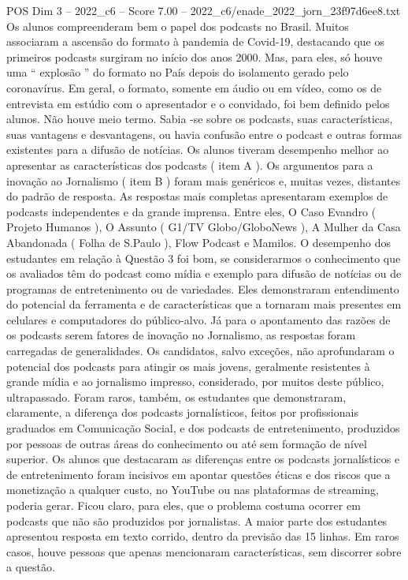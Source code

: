\begin{textsample}{POS Dim 3 – 2022\_c6 – Score 7.00 – 2022\_c6/enade\_2022\_jorn\_23f97d6ee8.txt}
Os alunos compreenderam bem o papel dos podcasts no Brasil.
Muitos associaram a ascensão do formato à pandemia de Covid-19, destacando que os primeiros podcasts surgiram no início dos anos 2000.
Mas, para eles, só houve uma “ explosão ” do formato no País depois do isolamento gerado pelo coronavírus.
Em geral, o formato, somente em áudio ou em vídeo, como os de entrevista em estúdio com o apresentador e o convidado, foi bem definido pelos alunos.
Não houve meio termo.
Sabia -se sobre os podcasts, suas características, suas vantagens e desvantagens, ou havia confusão entre o podcast e outras formas existentes para a difusão de notícias.
Os alunos tiveram desempenho melhor ao apresentar as características dos podcasts ( item A ).
Os argumentos para a inovação ao Jornalismo ( item B ) foram mais genéricos e, muitas vezes, distantes do padrão de resposta.
As respostas mais completas apresentaram exemplos de podcasts independentes e da grande imprensa.
Entre eles, O Caso Evandro ( Projeto Humanos ), O Assunto ( G1/TV Globo/GloboNews ), A Mulher da Casa Abandonada ( Folha de S.Paulo ), Flow Podcast e Mamilos.
O desempenho dos estudantes em relação à Questão 3 foi bom, se considerarmos o conhecimento que os avaliados têm do podcast como mídia e exemplo para difusão de notícias ou de programas de entretenimento ou de variedades.
Eles demonstraram entendimento do potencial da ferramenta e de características que a tornaram mais presentes em celulares e computadores do público-alvo.
Já para o apontamento das razões de os podcasts serem fatores de inovação no Jornalismo, as respostas foram carregadas de generalidades.
Os candidatos, salvo exceções, não aprofundaram o potencial dos podcasts para atingir os mais jovens, geralmente resistentes à grande mídia e ao jornalismo impresso, considerado, por muitos deste público, ultrapassado.
Foram raros, também, os estudantes que demonstraram, claramente, a diferença dos podcasts jornalísticos, feitos por profissionais graduados em Comunicação Social, e dos podcasts de entretenimento, produzidos por pessoas de outras áreas do conhecimento ou até sem formação de nível superior.
Os alunos que destacaram as diferenças entre os podcasts jornalísticos e de entretenimento foram incisivos em apontar questões éticas e dos riscos que a monetização a qualquer custo, no YouTube ou nas plataformas de streaming, poderia gerar.
Ficou claro, para eles, que o problema costuma ocorrer em podcasts que não são produzidos por jornalistas.
A maior parte dos estudantes apresentou resposta em texto corrido, dentro da previsão das 15 linhas.
Em raros casos, houve pessoas que apenas mencionaram características, sem discorrer sobre a questão.

\end{textsample}
